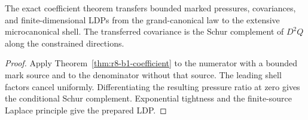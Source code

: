 \begin{theorem}
\label{thm:r8-b1-preparation}
The exact coefficient theorem transfers bounded marked pressures, covariances,
and finite-dimensional LDPs from the grand-canonical law to the extensive
microcanonical shell.  The transferred covariance is the Schur complement of
$D^2Q$ along the constrained directions.
\end{theorem}

\begin{proof}
Apply Theorem~\ref{thm:r8-b1-coefficient} to the numerator with a bounded mark
source and to the denominator without that source.  The leading shell factors
cancel uniformly.  Differentiating the resulting pressure ratio at zero gives
the conditional Schur complement.  Exponential tightness and the finite-source
Laplace principle give the prepared LDP.
\end{proof}

